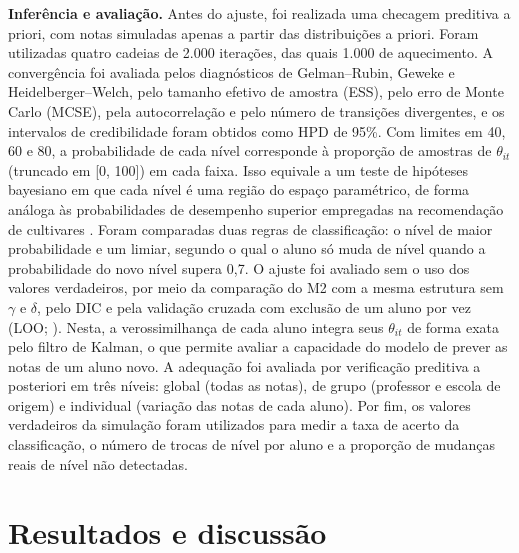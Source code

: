 \documentclass[11pt,a4paper]{article}
\begin{document}
\textbf{Inferência e avaliação.} Antes do ajuste, foi realizada uma checagem preditiva a
priori, com notas simuladas apenas a partir das distribuições a priori. Foram utilizadas quatro
cadeias de 2.000 iterações, das quais 1.000 de aquecimento. A convergência foi avaliada pelos
diagnósticos de Gelman--Rubin, Geweke e Heidelberger--Welch, pelo tamanho efetivo de amostra
(ESS), pelo erro de Monte Carlo (MCSE), pela autocorrelação e pelo número de transições
divergentes, e os intervalos de credibilidade foram obtidos como HPD de 95\%. Com limites em
40, 60 e 80, a probabilidade de cada nível corresponde à proporção de amostras de
$\theta_{it}$ (truncado em [0, 100]) em cada faixa. Isso equivale a um teste de hipóteses
bayesiano em que cada nível é uma região do espaço paramétrico, de forma análoga às
probabilidades de desempenho superior empregadas na recomendação de cultivares
\citep{dias2022}. Foram comparadas duas regras de classificação: o nível de maior
probabilidade e um limiar, segundo o qual o aluno só muda de nível quando a probabilidade do
novo nível supera 0,7. O ajuste foi avaliado sem o uso dos valores verdadeiros, por meio da
comparação do M2 com a mesma estrutura sem $\gamma$ e $\delta$, pelo DIC
\citep{spiegelhalter2002} e pela validação cruzada com exclusão de um aluno por vez (LOO;
\citealp{vehtari2017}). Nesta, a verossimilhança de cada aluno integra seus $\theta_{it}$ de
forma exata pelo filtro de Kalman, o que permite avaliar a capacidade do modelo de prever as
notas de um aluno novo. A adequação foi avaliada por verificação preditiva a posteriori em três
níveis: global (todas as notas), de grupo (professor e escola de origem) e individual (variação
das notas de cada aluno). Por fim, os valores verdadeiros da simulação foram utilizados para
medir a taxa de acerto da classificação, o número de trocas de nível por aluno e a proporção
de mudanças reais de nível não detectadas.

\section{Resultados e discussão}
\end{document}
